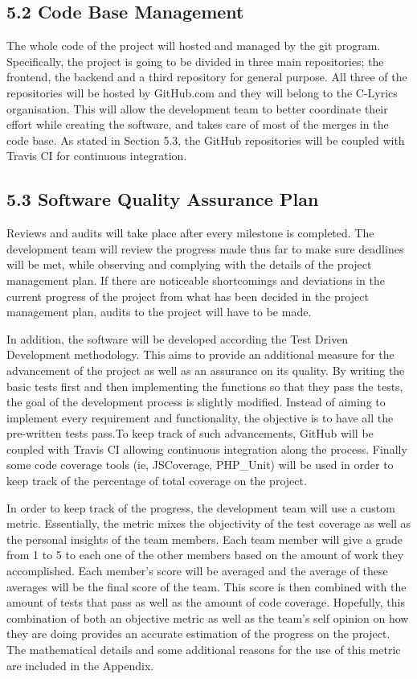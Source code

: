 \documentclass[]{article}
\begin{document}
\subsection{5.2 Code Base Management}\label{code-base-management}

The whole code of the project will hosted and managed by the git
program. Specifically, the project is going to be divided in three main
repositories; the frontend, the backend and a third repository for
general purpose. All three of the repositories will be hosted by
GitHub.com and they will belong to the C-Lyrics organisation. This will
allow the development team to better coordinate their effort while
creating the software, and takes care of most of the merges in the code
base. As stated in Section 5.3, the GitHub repositories will be coupled
with Travis CI for continuous integration.

\subsection{5.3 Software Quality Assurance
Plan}\label{software-quality-assurance-plan}

Reviews and audits will take place after every milestone is completed.
The development team will review the progress made thus far to make sure
deadlines will be met, while observing and complying with the details of
the project management plan. If there are noticeable shortcomings and
deviations in the current progress of the project from what has been
decided in the project management plan, audits to the project will have
to be made.

In addition, the software will be developed according the Test Driven
Development methodology. This aims to provide an additional measure for
the advancement of the project as well as an assurance on its quality.
By writing the basic tests first and then implementing the functions so
that they pass the tests, the goal of the development process is
slightly modified. Instead of aiming to implement every requirement and
functionality, the objective is to have all the pre-written tests
pass.To keep track of such advancements, GitHub will be coupled with
Travis CI allowing continuous integration along the process. Finally
some code coverage tools (ie, JSCoverage, PHP\_Unit) will be used in
order to keep track of the percentage of total coverage on the project.

In order to keep track of the progress, the development team will use a
custom metric. Essentially, the metric mixes the objectivity of the test
coverage as well as the personal insights of the team members. Each team
member will give a grade from 1 to 5 to each one of the other members
based on the amount of work they accomplished. Each member's score will
be averaged and the average of these averages will be the final score of
the team. This score is then combined with the amount of tests that pass
as well as the amount of code coverage. Hopefully, this combination of
both an objective metric as well as the team's self opinion on how they
are doing provides an accurate estimation of the progress on the
project. The mathematical details and some additional reasons for the
use of this metric are included in the Appendix.
\end{document}
